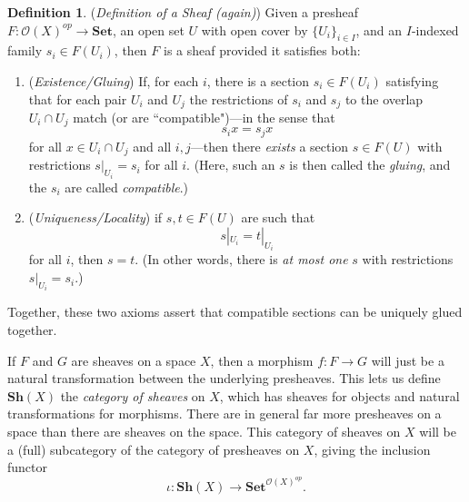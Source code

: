 \documentclass[a4paper]{book}
\theoremstyle{definition}
\theoremstyle{definition}
\newtheorem{definition}{Definition}[section]
\theoremstyle{definition}
\theoremstyle{theorem}
\theoremstyle{definition}
\begin{document}
	\begin{definition}
		(\textit{Definition of a Sheaf (again)})
		Given a presheaf $F: \mathscr{O}(X)^{op} \rightarrow \textbf{Set}$, an open set $U$ with open cover by $\{U_i\}_{i \in I}$, and an $I$-indexed family $s_i \in F(U_i)$, then $F$ is a sheaf provided it satisfies both: 
			\begin{enumerate}
				\item (\textit{Existence/Gluing}) If, for each $i$, there is a section $s_i \in F(U_i)$ satisfying that for each pair $U_i$ and $U_j$ the restrictions of $s_i$ and $s_j$ to the overlap $U_i \cap U_j$ match (or are ``compatible")---in the sense that   
				\begin{equation*}
				s_i x = s_j x
				\end{equation*}
				for all $x \in U_i \cap U_j$ and all $i, j$---then there \textit{exists} a section $s \in F(U)$ with restrictions $s |_{U_i} = s_i$ for all $i$. (Here, such an $s$ is then called the \textit{gluing}, and the $s_i$ are called \textit{compatible}.) 
				\item (\textit{Uniqueness/Locality}) if $s, t \in F(U)$ are such that 
				\begin{equation*} 
				s|_{U_i} = t|_{U_i}
				\end{equation*}
				for all $i$, 
				then $s = t$. (In other words, there is \textit{at most one} $s$ with restrictions $s|_{U_i} = s_i$.) 
			\end{enumerate} 
	Together, these two axioms assert that compatible sections can be uniquely glued together. 
	\end{definition} 
\noindent If $F$ and $G$ are sheaves on a space $X$, then a morphism $f: F \rightarrow G$ will just be a natural transformation between the underlying presheaves. This lets us define $\textbf{Sh}(X)$ the \textit{category of sheaves} on $X$, which has sheaves for objects and natural transformations for morphisms. There are in general far more presheaves on a space than there are sheaves on the space. This category of sheaves on $X$ will be a (full) subcategory of the category of presheaves on $X$, giving the inclusion functor 
\begin{equation*}
\iota: \textbf{Sh}(X) \rightarrow \textbf{Set}^{\mathscr{O}(X)^{op}}. 
\end{equation*}
\end{document}
